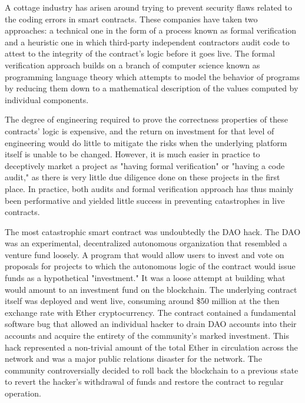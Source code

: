 A cottage industry has arisen around trying to prevent security flaws related to
the coding errors in smart contracts. These companies have taken two approaches:
a technical one in the form of a process known as formal verification and a
heuristic one in which third-party independent contractors audit code to attest
to the integrity of the contract's logic before it goes live. The formal
verification approach builds on a branch of computer science known as
programming language theory which attempts to model the behavior of programs by
reducing them down to a mathematical description of the values computed by
individual components.


The degree of engineering required to prove the correctness properties of these
contracts' logic is expensive, and the return on investment for that level of
engineering would do little to mitigate the risks when the underlying platform
itself is unable to be changed. However, it is much easier in practice to
deceptively market a project as "having formal verification" or "having a code
audit," as there is very little due diligence done on these projects in the
first place. In practice, both audits and formal verification approach has thus
mainly been performative and yielded little success in preventing catastrophes
in live contracts.

The most catastrophic smart contract was undoubtedly the DAO hack. The DAO was
an experimental, decentralized autonomous organization that resembled a venture
fund loosely. A program that would allow users to invest and vote on proposals
for projects to which the autonomous logic of the contract would issue funds as
a hypothetical "investment." It was a loose attempt at building what would
amount to an investment fund on the blockchain. The underlying contract itself
was deployed and went live, consuming around \$50 million at the then exchange
rate with Ether cryptocurrency. The contract contained a fundamental software
bug that allowed an individual hacker to drain DAO accounts into their accounts
and acquire the entirety of the community's marked investment. This hack
represented a non-trivial amount of the total Ether in circulation across the
network and was a major public relations disaster for the network. The community
controversially decided to roll back the blockchain to a previous state to
revert the hacker's withdrawal of funds and restore the contract to regular
operation. \cite{securities_sec_2017}

